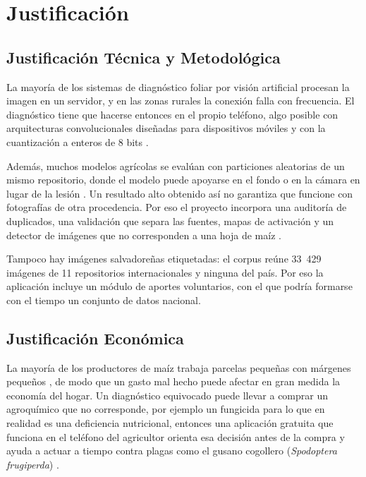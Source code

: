 \section{Justificaci\'on}

\subsection{Justificaci\'on T\'ecnica y Metodol\'ogica}
La mayor\'ia de los sistemas de diagn\'ostico foliar por visi\'on artificial procesan la imagen en un servidor, y en las zonas rurales la conexi\'on falla con frecuencia. El diagn\'ostico tiene que hacerse entonces en el propio tel\'efono, algo posible con arquitecturas convolucionales dise\~nadas para dispositivos m\'oviles \cite{howard2017,tan2019} y con la cuantizaci\'on a enteros de 8 bits \cite{jacob2018}.

Adem\'as, muchos modelos agr\'icolas se eval\'uan con particiones aleatorias de un mismo repositorio, donde el modelo puede apoyarse en el fondo o en la c\'amara en lugar de la lesi\'on \cite{ahmad2023a}. Un resultado alto obtenido as\'i no garantiza que funcione con fotograf\'ias de otra procedencia. Por eso el proyecto incorpora una auditor\'ia de duplicados, una validaci\'on que separa las fuentes, mapas de activaci\'on \cite{selvaraju2017} y un detector de im\'agenes que no corresponden a una hoja de ma\'iz \cite{lee2018}.

Tampoco hay im\'agenes salvadore\~nas etiquetadas: el corpus re\'une 33~429 im\'agenes de 11 repositorios internacionales y ninguna del pa\'is. Por eso la aplicaci\'on incluye un m\'odulo de aportes voluntarios, con el que podr\'ia formarse con el tiempo un conjunto de datos nacional.

\subsection{Justificaci\'on Econ\'omica}
La mayor\'ia de los productores de ma\'iz trabaja parcelas peque\~nas con m\'argenes peque\~nos \cite{mag2023}, de modo que un gasto mal hecho puede afectar en gran medida la econom\'ia del hogar. Un diagn\'ostico equivocado puede llevar a comprar un agroqu\'imico que no corresponde, por ejemplo un fungicida para lo que en realidad es una deficiencia nutricional, entonces una aplicaci\'on gratuita que funciona en el tel\'efono del agricultor orienta esa decisi\'on antes de la compra y ayuda a actuar a tiempo contra plagas como el gusano cogollero (\textit{Spodoptera frugiperda}) \cite{centa2022}.

